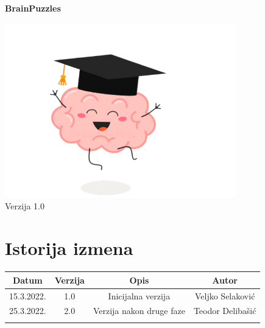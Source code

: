 \documentclass{article}
\date{}
\title{}
\begin{document}
\clearpage\maketitle
\thispagestyle{empty}
\providecommand{\inlinecode}[1]{\texttt{#1}}
\begin{center}
    \huge\textbf{BrainPuzzles}

    \hspace*{1cm}\includegraphics[width=10cm]{Resources/logo.png}\\
    \footnotesize Verzija 1.0

\end{center}
{\raggedleft\vfill{}\par
}
\newpage
\section*{Istorija izmena}
\vspace{1cm}
\begin{center}
\begin{tabular}{||c |c |c |c||} 
 \hline
 Datum & Verzija & Opis & Autor \\ [0.5ex] 
 \hline\hline
 15.3.2022. & 1.0 & Inicijalna verzija & Veljko Selaković \\ 
 \hline
 25.3.2022. & 2.0 & Verzija nakon druge faze & Teodor Delibašić \\
 \hline
 & & & \\
 \hline
\end{tabular}
\end{center}
\newpage
\tableofcontents
\end{document}
